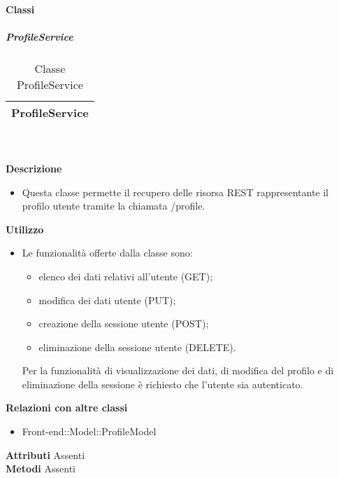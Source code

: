 		\paragraph{Classi}
			\subparagraph{ProfileService} 
\begin{table}[ht]
\begin{center}
\bgroup
	\setlength{\arrayrulewidth}{0.6mm}
	\def\arraystretch{1}
		\begin{tabular}{ | p{12cm} | }
				\hline  
					\centerline{\textbf{ProfileService}}
		\\ \hline 
				\hline
				\hline
		
		\end{tabular}
\egroup
\caption{Classe ProfileService}
\end{center}
\end{table} \textbf{\\ \\ Descrizione}
\begin{itemize}
\item[] Questa classe permette il recupero delle risorsa REST rappresentante il profilo utente tramite la chiamata /profile.
\end{itemize} 
\textbf{Utilizzo}
\begin{itemize}
\item[] Le funzionalità offerte dalla classe sono:
\begin{itemize}
\item elenco dei dati relativi all'utente (GET);
\item modifica dei dati utente (PUT);
\item creazione della sessione utente (POST);
\item eliminazione della sessione utente (DELETE).
\end{itemize}

Per la funzionalità di visualizzazione dei dati, di modifica del profilo e di eliminazione della sessione è richiesto che l'utente sia autenticato.
\end{itemize}
\textbf{Relazioni con altre classi}
\begin{itemize}
\item{Front-end::Model::ProfileModel}
\end{itemize}
\textbf{Attributi}
Assenti \\
\textbf{Metodi}
Assenti \\

